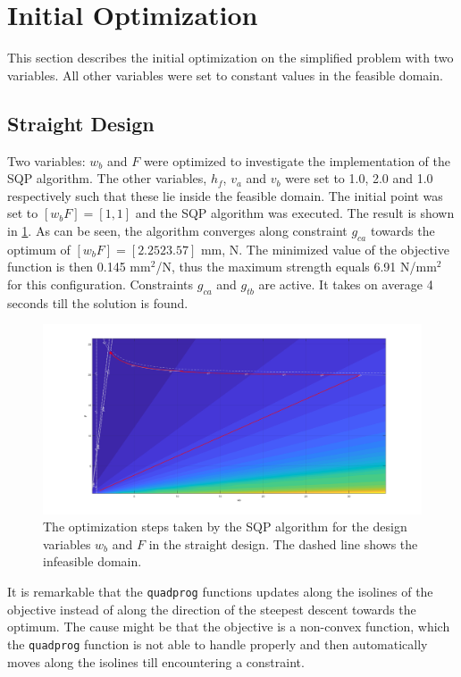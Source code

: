 \section{Initial Optimization}
This section describes the initial optimization on the simplified problem with two variables. 
All other variables were set to constant values in the feasible domain. 

\subsection{Straight Design}
Two variables: $w_b$ and $F$ were optimized to investigate the implementation of the SQP algorithm. 
The other variables, $h_f$, $v_a$ and $v_b$ were set to 1.0, 2.0 and 1.0 respectively such that these lie inside the feasible domain. 
The initial point was set to $[w_b F] = [1, 1]$ and the SQP algorithm was executed. 
The result is shown in \cref{fig:straightopt}.
As can be seen, the algorithm converges along constraint $g_{ca}$ towards the optimum of $[w_b F] = [2.25 23.57]$ mm, N. 
The minimized value of the objective function is then 0.145 mm$^2$/N, thus the maximum strength equals 6.91 N/mm$^2$ for this configuration. 
Constraints $g_{ca}$ and $g_{tb}$ are active. 
It takes on average 4 seconds till the solution is found. 


\begin{figure}[H]
	\centering
	\includegraphics[width=\columnwidth]{../sources/plots/straight2var.png}
	\caption{The optimization steps taken by the SQP algorithm for the design variables $w_b$ and $F$ in the straight design.
		The dashed line shows the infeasible domain.}
	\label{fig:straightopt}
\end{figure}

It is remarkable that the \texttt{quadprog} functions updates along the isolines of the objective instead of along the direction of the steepest descent towards the optimum.
The cause might be that the objective is a non-convex function, which the \texttt{quadprog} function is not able to handle properly and then automatically moves along the isolines till encountering a constraint.


